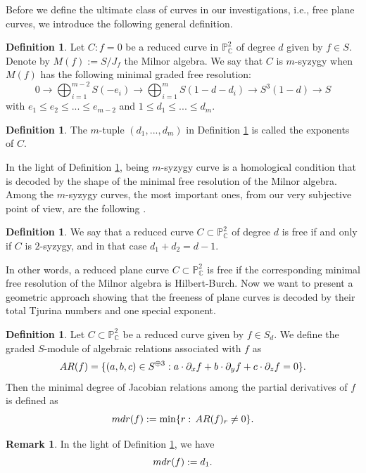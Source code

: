 \documentclass[12pt]{article}
\theoremstyle{plain}
\theoremstyle{definition}
\newtheorem{definition}[thm]{Definition}
\newtheorem{remark}[thm]{Remark}
\renewcommand\leq{\leqslant}
\begin{document}
Before we define the ultimate class of curves in our investigations, i.e., free plane curves, we introduce the following general definition.
 
\begin{definition}
\label{hom}
Let $C : f=0$ be a reduced curve in $\mathbb{P}^{2}_{\mathbb{C}}$ of degree $d$ given by $f \in S$. Denote by $M(f) := S/ J_{f}$ the Milnor algebra. We say that $C$ is $m$-syzygy when $M(f)$ has the following minimal graded free resolution:
$$0 \rightarrow \bigoplus_{i=1}^{m-2}S(-e_{i}) \rightarrow \bigoplus_{i=1}^{m}S(1-d - d_{i}) \rightarrow S^{3}(1-d)\rightarrow S$$
with $e_{1} \leq e_{2} \leq ... \leq e_{m-2}$ and $1\leq d_{1} \leq ... \leq d_{m}$. 
\end{definition}
\begin{definition}
The $m$-tuple $(d_{1}, ..., d_{m})$ in Definition \ref{hom} is called the exponents of $C$.
\end{definition}
In the light of Definition \ref{hom}, being $m$-syzygy curve is a homological condition that is decoded by the shape of the minimal free resolution of the Milnor algebra. Among the $m$-syzygy curves, the most important ones, from our very subjective point of view, are the following \cite{Saito}.
\begin{definition}
We say that a reduced curve $C \subset \mathbb{P}^{2}_{\mathbb{C}}$ of degree $d$ is free if and only if $C$ is $2$-syzygy, and in that case $d_{1}+d_{2}=d-1$.
\end{definition}
In other words, a reduced plane curve $C \subset \mathbb{P}^{2}_{\mathbb{C}}$ is free if the corresponding minimal free resolution of the Milnor algebra is Hilbert-Burch. Now we want to present a geometric approach showing that the freeness of plane curves is decoded by their total Tjurina numbers and one special exponent.
\begin{definition}
Let $C \subset \mathbb{P}^{2}_{\mathbb{C}}$ be a reduced curve given by $f \in S_{d}$.
We define the graded $S$-module of algebraic relations associated with $f$ as
$${\rm AR}(f) = \{(a,b,c)\in S^{\oplus 3} : a \cdot\partial_{x}f+ b\cdot \partial_{y} f + c\cdot \partial_{z} f =0 \}.$$
Then the minimal degree of Jacobian relations among the partial derivatives of $f$ is defined as
$${\rm mdr}(f):=\min\{r : \, {\rm AR}(f)_{r} \neq 0 \}.$$
\end{definition}
\begin{remark}
In the light of Definition \ref{hom}, we have 
$${\rm mdr}(f) := d_{1}.$$
\end{remark}
\end{document}
